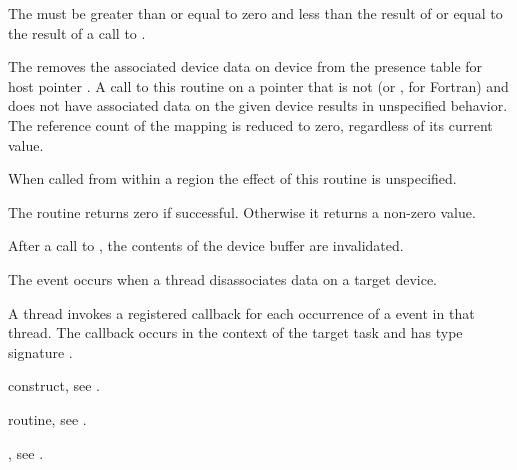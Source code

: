 \constraints
The  must be greater than or equal to zero and less 
than the result of  or equal to the result 
of a call to .

\effect
The  removes the associated device data
on device  from the presence table for host pointer
. A call to this routine on a pointer that is not
 (or , for Fortran) and does not have
associated data on the given device results
in unspecified behavior.  The reference count of the mapping is reduced to
zero, regardless of its current value.

When called from within a  region
the effect of this routine is unspecified.

The routine returns zero if successful. Otherwise it returns a non-zero value.

After a call to , the contents of the device
buffer are invalidated.

\events
The  event occurs when a thread 
disassociates data on a target device.

\tools
A thread invokes a registered 
callback for each occurrence of a  
event in that thread. The callback occurs in the context of the 
target task and has type signature .

\begin{crossrefs}
\item {} construct, see
.

\item {} routine, see
.

\item {}, see
.
\end{crossrefs}

